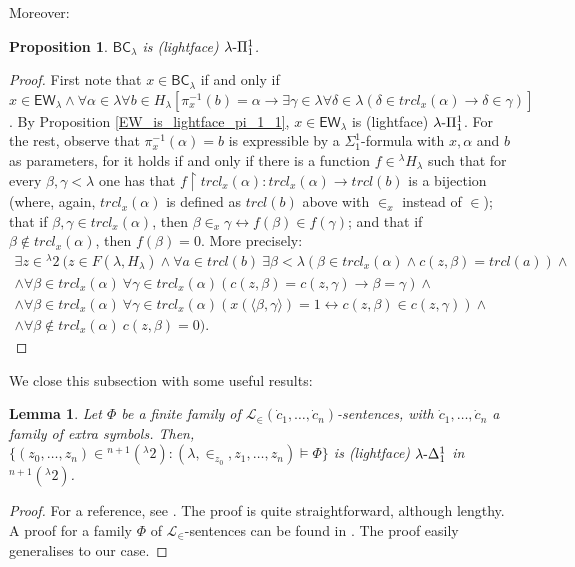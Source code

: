 \documentclass{amsart}
\numberwithin{equation}{section}
\def\hyp{{\hbox{-}}}
\newtheorem{lemma}[theorem]{Lemma}
\newtheorem{proposition}[theorem]{Proposition}
\theoremstyle{definition}
\theoremstyle{remark}
\begin{document}
Moreover:

\begin{proposition}\label{prop:BC-is-pi-11}
	$\mathsf{BC}_\lambda$ is \emph{(lightface)} $\lambda\hyp\Pi^1_1$. 
\end{proposition}
\begin{proof}
	First note that $x\in\mathsf{BC}_\lambda$ if and only if $x\in\mathsf{EW}_\lambda\wedge \forall\alpha\in\lambda\forall b\in H_\lambda[\pi^{-1}_x(b)=\alpha\rightarrow\exists\gamma\in\lambda\forall\delta\in\lambda(\delta\in trcl_x(\alpha)\rightarrow\delta\in\gamma)]$. By Proposition \ref{EW_is_lightface_pi_1_1}, $x\in\mathsf{EW}_\lambda$ is (lightface) $\lambda\hyp\Pi^1_1$. For the rest, observe that $\pi^{-1}_x(\alpha)=b$ is expressible by a $\Sigma^1_1$-formula with $x,\alpha$ and $b$ as parameters, for it holds if and only if there is a function $f\in{}^{\lambda}H_\lambda$ such that for every $\beta,\gamma<\lambda$ one has that $f\upharpoonright trcl_x(\alpha):trcl_x(\alpha)\rightarrow trcl(b)$ is a bijection (where, again, $trcl_x(\alpha)$ is defined as $trcl(b)$ above with $\in_x$ instead of $\in$); that if $\beta,\gamma\in trcl_x(\alpha)$, then $\beta\in_x\gamma\leftrightarrow f(\beta)\in f(\gamma)$; and that if $\beta\notin trcl_x(\alpha)$, then $f(\beta)=0$. More precisely:
    \begin{gather*}
      \exists z\in{}^\lambda 2\ (z\in F(\lambda,H_\lambda) \land \forall a\in trcl(b)\ \exists \beta<\lambda (\beta\in trcl_x(\alpha) \land c(z,\beta)=trcl(a))\land\\
      \land \forall\beta\in trcl_x(\alpha)\ \forall\gamma\in trcl_x(\alpha) (c(z,\beta)=c(z,\gamma)\rightarrow\beta=\gamma)\land\\
      \land  \forall\beta\in trcl_x(\alpha)\ \forall\gamma\in trcl_x(\alpha) ( x(\langle \beta,\gamma \rangle)=1 \leftrightarrow c(z,\beta)\in c(z,\gamma))\land\\
      \land \forall \beta\notin trcl_x(\alpha)\ c(z,\beta)=0).
    \end{gather*}
\end{proof}






We close this subsection with some useful results:

\begin{lemma}\label{lemma:complexity_of_satisfaction}
    Let $\Phi$ be a finite family of $\mathcal{L}_\in(\dot{c}_1,\ldots,\dot{c}_n)$-sentences, with $\dot{c}_1,\ldots,\dot{c}_n$ a family of extra symbols. Then, $\{(z_0,\ldots,z_n)\in{}^{n+1}(^{\lambda}2):(\lambda,\in_{z_0},z_1,\ldots,z_n)\vDash\Phi\}$ is \emph{(lightface)} $\lambda\hyp\Delta^1_1$ in $^{n+1}({}^{\lambda}2)$.
\end{lemma}
\begin{proof}
    For a reference, see \cite[Proposition 13.8]{Kanamori}. The proof is quite straightforward, although lengthy. A proof for a family $\Phi$ of $\mathcal L_\in$-sentences can be found in \cite[Chapter 3. ]{drake1974introduction}. The proof easily generalises to our case. 
\end{proof}
\end{document}

